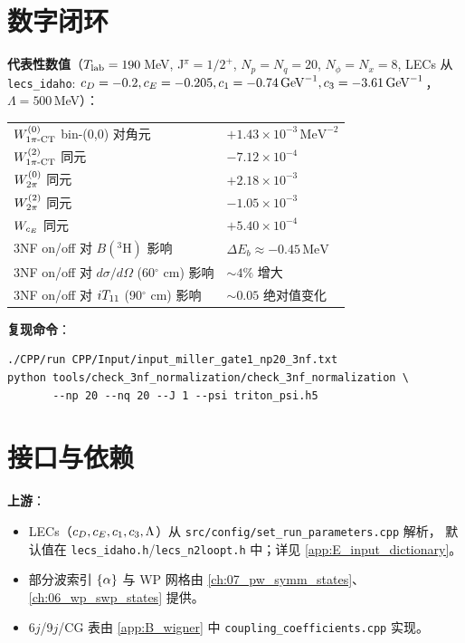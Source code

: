 \section{数字闭环}
\label{sec:ch16-numerical-closure}

\begin{numericalbox}
\textbf{代表性数值}（\({T_{\text{lab}}}=190\,\)MeV, J\(^\pi=1/2^+\), \(N_p=N_q=20\), \(N_\phi=N_x=8\),
LECs 从 \texttt{lecs\_idaho}: \(c_D=-0.2,c_E=-0.205,c_1=-0.74\,{\rm GeV}^{-1},c_3=-3.61\,{\rm GeV}^{-1}\)，
\(\Lambda=500\,\)MeV）：

\begin{tabular}{ll}
\toprule
\(W^{(0)}_{\rm 1\pi\text{-CT}}\) bin-(0,0) 对角元 & \(+1.43\times 10^{-3}\,\mathrm{MeV}^{-2}\) \\
\(W^{(2)}_{\rm 1\pi\text{-CT}}\) 同元 & \(-7.12\times 10^{-4}\) \\
\(W^{(0)}_{\rm 2\pi}\) 同元 & \(+2.18\times 10^{-3}\) \\
\(W^{(2)}_{\rm 2\pi}\) 同元 & \(-1.05\times 10^{-3}\) \\
\(W_{c_E}\) 同元 & \(+5.40\times 10^{-4}\) \\
\midrule
3NF on/off 对 \(B(^3\mathrm{H})\) 影响 & \(\Delta E_b \approx -0.45\,\mathrm{MeV}\) \\
3NF on/off 对 \(d\sigma/d\Omega\) (60\(^\circ\) cm) 影响 & \(\sim 4\%\) 增大 \\
3NF on/off 对 \({i T_{11}}\) (90\(^\circ\) cm) 影响 & \(\sim 0.05\) 绝对值变化 \\
\bottomrule
\end{tabular}

\textbf{复现命令}：
\begin{verbatim}
./CPP/run CPP/Input/input_miller_gate1_np20_3nf.txt
python tools/check_3nf_normalization/check_3nf_normalization \
       --np 20 --nq 20 --J 1 --psi triton_psi.h5
\end{verbatim}
\end{numericalbox}

\section{接口与依赖}
\label{sec:ch16-interfaces}

\textbf{上游}：
\begin{itemize}
  \item LECs（\(c_D,c_E,c_1,c_3,\Lambda\)）从 \texttt{src/config/set\_run\_parameters.cpp} 解析，
        默认值在 \texttt{lecs\_idaho.h}/\texttt{lecs\_n2loopt.h} 中；详见 \cref{app:E_input_dictionary}。
  \item 部分波索引 \(\{\alpha\}\) 与 WP 网格由 \cref{ch:07_pw_symm_states}、\cref{ch:06_wp_swp_states} 提供。
  \item 6\(j\)/9\(j\)/CG 表由 \cref{app:B_wigner} 中 \texttt{coupling\_coefficients.cpp} 实现。
\end{itemize}

